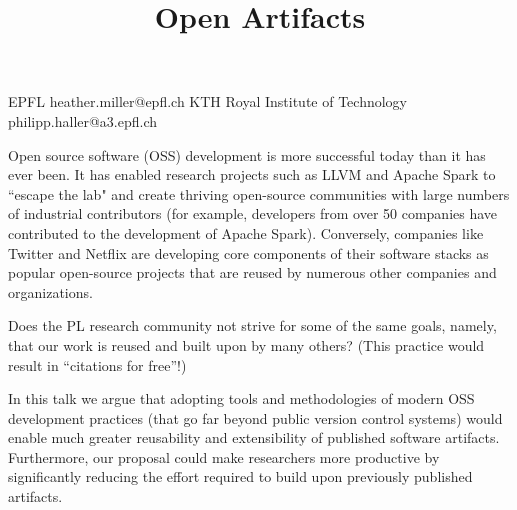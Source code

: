 \documentclass{sigplanconf}
\begin{document}
\setlength{\pdfpageheight}{\paperheight}
\setlength{\pdfpagewidth}{\paperwidth}






\title{Open Artifacts}

           {EPFL}
           {heather.miller@epfl.ch}
           {KTH Royal Institute of Technology}
           {philipp.haller@a3.epfl.ch}

\maketitle


Open source software (OSS) development is more successful today than it has
ever been. It has enabled research projects such as LLVM and Apache Spark to
``escape the lab" and create thriving open-source communities with large
numbers of industrial contributors (for example, developers from over 50
companies have contributed to the development of Apache Spark). Conversely,
companies like Twitter and Netflix are developing core components of their
software stacks as popular open-source projects that are reused by numerous
other companies and organizations.

Does the PL research community not strive for some of the same goals, namely,
that our work is reused and built upon by many others? (This practice would
result in ``citations for free''!)

In this talk we argue that adopting tools and methodologies of modern OSS
development practices (that go far beyond public version control systems)
would enable much greater reusability and extensibility of published software
artifacts. Furthermore, our proposal could make researchers more productive by
significantly reducing the effort required to build upon previously published
artifacts.
\end{document}
